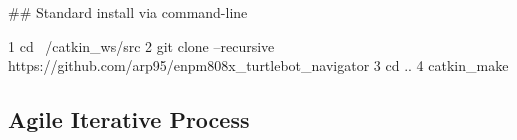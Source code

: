 \#\# Standard install via command-\/line 
\begin{DoxyCode}
1 cd ~/catkin\_ws/src
2 git clone --recursive https://github.com/arp95/enpm808x\_turtlebot\_navigator
3 cd ..
4 catkin\_make
\end{DoxyCode}


\subsection*{Agile Iterative Process}

\href{https://docs.google.com/spreadsheets/d/1Gf2HPhlzFCxhdOP1XlNDx23QuuKKL7okn-5ru6TXR6c/edit?usp=sharing}{\tt } 